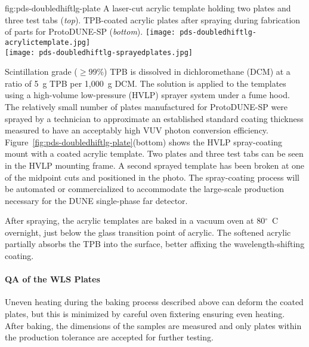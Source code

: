 \begin{dunefigure}
{fig:pds-doubledhiftlg-plate}
{A laser-cut acrylic template holding two plates and three test tabs ({\it top}). TPB-coated acrylic plates after spraying during fabrication of parts for ProtoDUNE-SP ({\it bottom}).}
    \texttt{[image: pds-doubledhiftlg-acrylictemplate.jpg]}\\
    \vspace{0.3cm}
    \texttt{[image: pds-doubledhiftlg-sprayedplates.jpg]}
\end{dunefigure}

Scintillation grade ($\ge 99$\%) TPB is dissolved in dichloromethane (DCM) at a ratio of 5~g TPB per 1,000~g DCM. The solution is applied to the templates using a high-volume low-pressure (HVLP) sprayer system under a fume hood. The relatively small number of plates manufactured for ProtoDUNE-SP were sprayed by a technician to approximate an established standard coating thickness measured to have an acceptably high VUV photon conversion efficiency. Figure~\ref{fig:pds-doubledhiftlg-plate}(bottom) shows the HVLP spray-coating mount with a coated acrylic template. Two plates and three test tabs can be seen in the HVLP mounting frame. A second sprayed template has been broken at one of the midpoint cuts and positioned in the photo. The spray-coating process will be automated or commercialized to accommodate the large-scale production necessary for the DUNE single-phase far detector.

After spraying, the acrylic templates are baked in a vacuum oven at 80$^{\circ}$~C overnight, just below the glass transition point of acrylic. The softened acrylic partially absorbs the TPB into the surface, better affixing the wavelength-shifting coating.


\paragraph*{QA of the WLS Plates}

Uneven heating during the baking process described above can deform the coated plates, but this is minimized by careful oven fixtering ensuring even heating. After baking, the dimensions of the samples are measured and only plates within the production tolerance are accepted for further testing.

